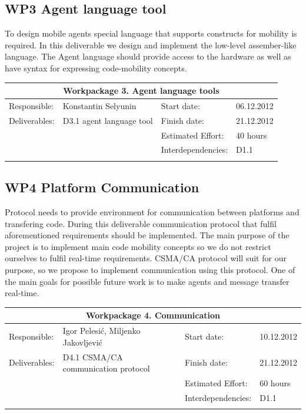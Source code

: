 \documentclass{scrreprt}
\begin{document}
	\subsection{WP3 Agent language tool}

To design mobile agents special language that supports constructs for mobility is required.
In this deliverable we design and implement the low-level assember-like language.
The Agent language should provide access to the hardware as well as have syntax for expressing code-mobility concepts. 

\vspace{0.2in}
\begin{tabular}{|ll|ll|}
\hline \multicolumn{4}{|c|}{\textbf{Workpackage 3. Agent language tools }}\\
\hline
Responsible:	&  Konstantin Selyunin			& Start date:		& 06.12.2012 \\
Deliverables:	&  D3.1 agent language tool		& Finish date:	 	& 21.12.2012\\
		&  					& Estimated Effort: 	& 40 hours \\
		&  					& Interdependencies:	& D1.1 	\\
		&  					& 			& 	\\
\hline
\end{tabular}


	\subsection{WP4 Platform Communication}

Protocol needs to provide environment for communication between platforms and transfering code.
During this deliverable communication protocol that fulfil aforementioned requirements should be implemented.
The main purpose of the project is to implement main code mobility concepts
so we do not restrict ourselves to fulfil real-time requirements.
CSMA/CA protocol will suit for our purpose, so we propose to implement communication using this protocol.
One of the main goals for possible future work is to make agents and message transfer real-time.


\vspace{0.2in}
\begin{tabular}{|ll|ll|}
\hline \multicolumn{4}{|c|}{\textbf{Workpackage 4. Communication }}\\
\hline
Responsible:	&  Igor Pelesi\'c, Miljenko Jakovljevi\'c & Start date:		& 10.12.2012 \\
Deliverables:	&  D4.1 CSMA/CA communication protocol	& Finish date:	 	& 21.12.2012\\
		&  					& Estimated Effort: 	& 60 hours \\
		&  					& Interdependencies:	& D1.1	\\
		&  					& 			& 	\\
\hline
\end{tabular}
\end{document}
